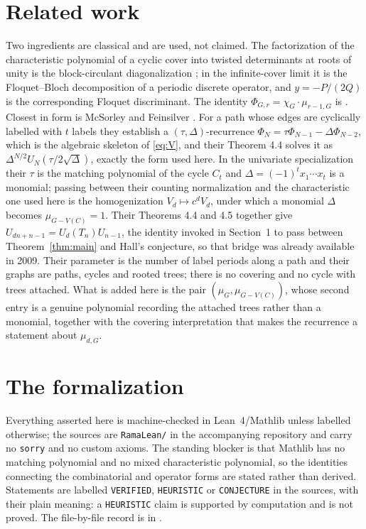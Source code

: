 \documentclass[11pt]{article}
\theoremstyle{remark}
\begin{document}
\section{Related work}
Two ingredients are classical and are used, not claimed. The factorization of
the characteristic polynomial of a cyclic cover into twisted determinants at
roots of unity is the block-circulant diagonalization
\cite{MS,DFMRS}; in the infinite-cover limit it is the Floquet--Bloch
decomposition of a periodic discrete operator, and $y=-P/(2Q)$ is the
corresponding Floquet discriminant. The identity
$\Phi_{G,r}=\chi_G\cdot\mu_{r-1,G}$ is \cite{HPS}. Closest in form is
McSorley and Feinsilver \cite{MF}. For a path whose edges are cyclically
labelled with $t$ labels they establish a $(\tau,\Delta)$-recurrence
$\Phi_{N}=\tau\Phi_{N-1}-\Delta\Phi_{N-2}$, which is the algebraic skeleton of
\eqref{eq:V}, and their Theorem 4.4 solves it as
$\Delta^{N/2}U_N(\tau/2\sqrt{\Delta})$, exactly the form used here. In the
univariate specialization their $\tau$ is the matching polynomial of the cycle
$C_t$ and $\Delta=(-1)^tx_1\cdots x_t$ is a monomial; passing between their
counting normalization and the characteristic one used here is the
homogenization $V_d\mapsto c^dV_d$, under which a monomial $\Delta$ becomes
$\mu_{G-V(C)}=1$. Their Theorems 4.4 and 4.5 together give
$U_{dn+n-1}=U_d(T_n)U_{n-1}$, the identity invoked in Section~1 to pass between
Theorem~\ref{thm:main} and Hall's conjecture, so that bridge was already
available in 2009. Their parameter is the number of label periods along a path
and their graphs are paths, cycles and rooted trees; there is no covering and
no cycle with trees attached. What is added here is the pair
$(\mu_G,\mu_{G-V(C)})$, whose second entry is a genuine polynomial recording
the attached trees rather than a monomial, together with the covering
interpretation that makes the recurrence a statement about $\mu_{d,G}$.



\section{The formalization}

Everything asserted here is machine-checked in Lean~4/Mathlib unless labelled otherwise; the
sources are \texttt{RamaLean/} in the accompanying repository and carry no \texttt{sorry} and no
custom axioms. The standing blocker is that Mathlib has no matching polynomial and no mixed
characteristic polynomial, so the identities connecting the combinatorial and operator forms are
stated rather than derived. Statements are labelled \texttt{VERIFIED}, \texttt{HEURISTIC} or
\texttt{CONJECTURE} in the sources, with their plain meaning: a \texttt{HEURISTIC} claim is
supported by computation and is not proved. The file-by-file record is in \cite{Supp2}.
\end{document}
